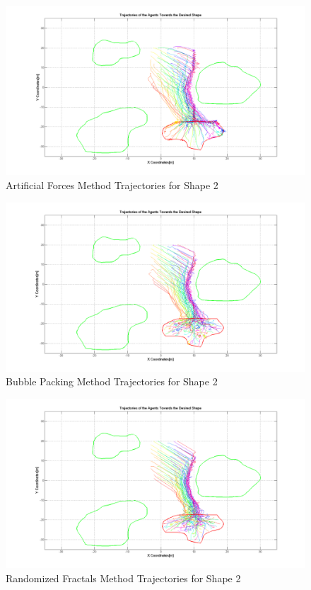 \begin{figure}[H]
\caption{Artificial Forces Method Trajectories for Shape 2}
\centerline{\includegraphics[scale = 0.35]{Artificial_Trajectories_2}}
\end{figure} 	
		   
\begin{figure}[H]
\caption{Bubble Packing Method Trajectories for Shape 2}
\centerline{\includegraphics[scale = 0.35]{Bubble_Trajectories_2}}
\end{figure} 	
		   
\begin{figure}[H]
\caption{Randomized Fractals Method Trajectories for Shape 2}
\centerline{\includegraphics[scale = 0.35]{Randomized_Trajectories_2}}
\end{figure} 	
		   
